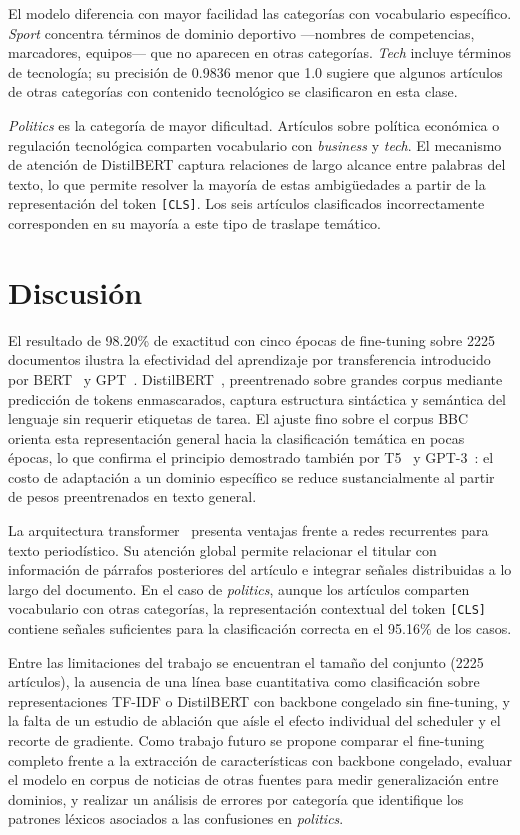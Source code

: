 \documentclass[letterpaper, 10 pt, conference]{latex_template/ieeeconf}
\begin{document}
El modelo diferencia con mayor facilidad las categorías con vocabulario específico. \textit{Sport} concentra términos de dominio deportivo —nombres de competencias, marcadores, equipos— que no aparecen en otras categorías. \textit{Tech} incluye términos de tecnología; su precisión de 0.9836 menor que 1.0 sugiere que algunos artículos de otras categorías con contenido tecnológico se clasificaron en esta clase.

\textit{Politics} es la categoría de mayor dificultad. Artículos sobre política económica o regulación tecnológica comparten vocabulario con \textit{business} y \textit{tech}. El mecanismo de atención de DistilBERT captura relaciones de largo alcance entre palabras del texto, lo que permite resolver la mayoría de estas ambigüedades a partir de la representación del token \texttt{[CLS]}. Los seis artículos clasificados incorrectamente corresponden en su mayoría a este tipo de traslape temático.

\section{Discusión}

El resultado de 98.20\% de exactitud con cinco épocas de fine-tuning sobre 2225 documentos ilustra la efectividad del aprendizaje por transferencia introducido por BERT~\cite{c2} y GPT~\cite{c3}. DistilBERT~\cite{c5}, preentrenado sobre grandes corpus mediante predicción de tokens enmascarados, captura estructura sintáctica y semántica del lenguaje sin requerir etiquetas de tarea. El ajuste fino sobre el corpus BBC orienta esta representación general hacia la clasificación temática en pocas épocas, lo que confirma el principio demostrado también por T5~\cite{c6} y GPT-3~\cite{c7}: el costo de adaptación a un dominio específico se reduce sustancialmente al partir de pesos preentrenados en texto general.

La arquitectura transformer~\cite{c1} presenta ventajas frente a redes recurrentes para texto periodístico. Su atención global permite relacionar el titular con información de párrafos posteriores del artículo e integrar señales distribuidas a lo largo del documento. En el caso de \textit{politics}, aunque los artículos comparten vocabulario con otras categorías, la representación contextual del token \texttt{[CLS]} contiene señales suficientes para la clasificación correcta en el 95.16\% de los casos.

Entre las limitaciones del trabajo se encuentran el tamaño del conjunto (2225 artículos), la ausencia de una línea base cuantitativa como clasificación sobre representaciones TF-IDF o DistilBERT con backbone congelado sin fine-tuning, y la falta de un estudio de ablación que aísle el efecto individual del scheduler y el recorte de gradiente. Como trabajo futuro se propone comparar el fine-tuning completo frente a la extracción de características con backbone congelado, evaluar el modelo en corpus de noticias de otras fuentes para medir generalización entre dominios, y realizar un análisis de errores por categoría que identifique los patrones léxicos asociados a las confusiones en \textit{politics}.
\end{document}
